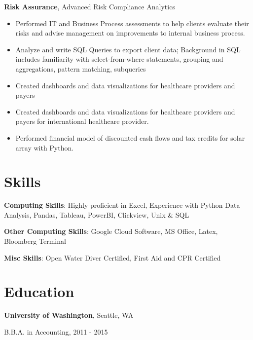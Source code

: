\documentclass[margin,line]{res2}
\begin{document}
\begin{resume}
{\bf Risk Assurance}, Advanced Risk Compliance Analytics
\begin{itemize}[leftmargin=-.13in]
\item Performed IT and Business Process assessments to help clients evaluate their risks and advise management on improvements to internal business process. 
\item Analyze and write SQL Queries to export client data; Background in SQL includes familiarity with select-from-where statements, grouping and aggregations, pattern matching, subqueries
\item Created dashboards and data visualizations for healthcare providers and payers 
\item Created dashboards and data visualizations for healthcare providers and payers for international healthcare provider.
\item Performed financial model of discounted cash flows and tax credits for solar array with Python.    
\end{itemize}
\vspace*{1.5mm}

\section{\sc Skills} 
{\bf Computing Skills}:  Highly proficient in Excel, Experience with Python Data Analysis, Pandas, Tableau, PowerBI, Clickview, Unix \& SQL
\vspace*{-3mm}

{\bf Other Computing Skills}: Google Cloud Software, MS Office, Latex, Bloomberg Terminal
\vspace*{-3mm}

{\bf Misc Skills}: Open Water Diver Certified, First Aid and CPR Certified
\vspace*{-3mm}

\section{\sc Education}
{\bf University of Washington}, Seattle, WA

\vspace*{-4mm}
B.B.A. in Accounting, 2011 - 2015 


\end{resume}
\end{document}
